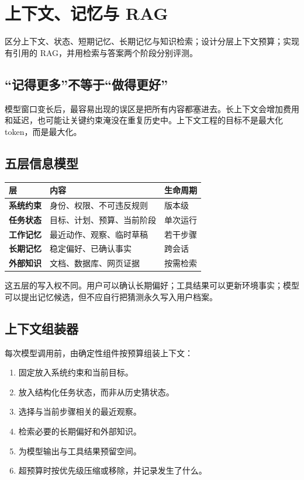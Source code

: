 \chapter{上下文、记忆与 RAG}
\label{chap:context}

\begin{takeaway}[学习目标]
区分上下文、状态、短期记忆、长期记忆与知识检索；设计分层上下文预算；实现有引用的 RAG，并用检索与答案两个阶段分别评测。
\end{takeaway}

\section{“记得更多”不等于“做得更好”}

模型窗口变长后，最容易出现的误区是把所有内容都塞进去。长上下文会增加费用和延迟，也可能让关键约束淹没在重复历史中。上下文工程的目标不是最大化 token，而是最大化。

\section{五层信息模型}

\begin{table}[htbp]
\centering
\begin{tabularx}{\textwidth}{>{\bfseries}p{} X X}
\toprule
层 & 内容 & 生命周期 \\
\midrule
系统约束 & 身份、权限、不可违反规则 & 版本级 \\
任务状态 & 目标、计划、预算、当前阶段 & 单次运行 \\
工作记忆 & 最近动作、观察、临时草稿 & 若干步骤 \\
长期记忆 & 稳定偏好、已确认事实 & 跨会话 \\
外部知识 & 文档、数据库、网页证据 & 按需检索 \\
\bottomrule
\end{tabularx}
\end{table}

这五层的写入权不同。用户可以确认长期偏好；工具结果可以更新环境事实；模型可以提出记忆候选，但不应自行把猜测永久写入用户档案。

\section{上下文组装器}

每次模型调用前，由确定性组件按预算组装上下文：

\begin{enumerate}
  \item 固定放入系统约束和当前目标。
  \item 放入结构化任务状态，而非从历史猜状态。
  \item 选择与当前步骤相关的最近观察。
  \item 检索必要的长期偏好和外部知识。
  \item 为模型输出与工具结果预留空间。
  \item 超预算时按优先级压缩或移除，并记录发生了什么。
\end{enumerate}

